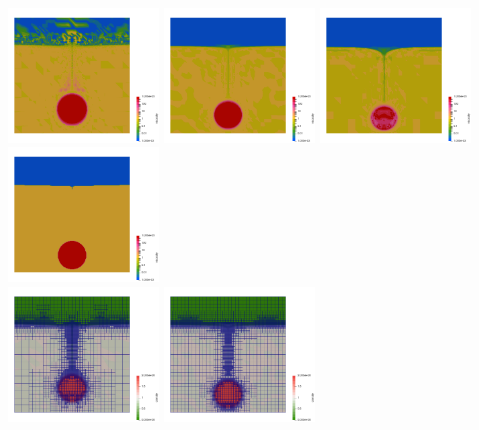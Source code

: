\begin{center}
\includegraphics[width=4cm]{images/stokes_sphere_fs2D/aspects/eta_a}
\includegraphics[width=4cm]{images/stokes_sphere_fs2D/aspects/eta_g}
\includegraphics[width=4cm]{images/stokes_sphere_fs2D/aspects/eta_h}
\includegraphics[width=4cm]{images/stokes_sphere_fs2D/aspects/eta_m}\\
\includegraphics[width=4cm]{images/stokes_sphere_fs2D/aspects/rho_a}
\includegraphics[width=4cm]{images/stokes_sphere_fs2D/aspects/rho_g}

\end{center}

